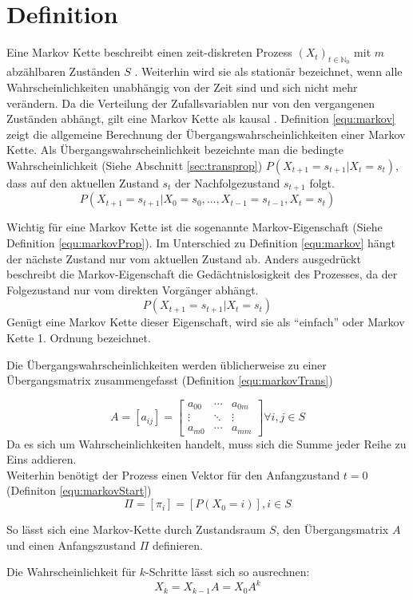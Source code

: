 \section{Definition}
Eine Markov Kette beschreibt einen zeit-diskreten Prozess \((X_t)_{t\in\mathbb{N}_0}\) mit  \(m\) abzählbaren Zuständen \(S\) \cite{stochMod}.
Weiterhin wird sie als stationär bezeichnet, wenn alle Wahrscheinlichkeiten unabhängig von der Zeit sind und sich nicht mehr verändern.
Da die Verteilung der Zufallsvariablen nur von den vergangenen Zuständen abhängt, gilt eine Markov Kette als kausal \cite[48]{mmmFink}.
Definition \ref{equ:markov} zeigt die allgemeine Berechnung der Übergangswahrscheinlichkeiten einer Markov Kette. Als Übergangswahrscheinlichkeit bezeichnte man die bedingte Wahrscheinlichkeit (Siehe Abschnitt \ref{sec:transprop}) \(P ( X_{t+1} = s_{t+1} | X_{t} = s_{t} ) \), dass auf den aktuellen Zustand \( s_{t}\) der Nachfolgezustand \( s_{t+1}\) folgt. 
\begin{equation}
\label{equ:markov}
P (X_{t+1} = s_{t+1} | X_0 = s_0, \ldots , X_{t-1} = s_{t-1}, X_{t} = s_{t})
\end{equation}

Wichtig für eine Markov Kette ist die sogenannte Markov-Eigenschaft (Siehe Definition \ref{equ:markovProp}). Im Unterschied zu Definition \ref{equ:markov} hängt der nächste Zustand nur vom aktuellen Zustand ab. Anders ausgedrückt beschreibt die Markov-Eigenschaft die Gedächtnislosigkeit des Prozesses, da der Folgezustand nur vom direkten Vorgänger abhängt. 
\begin{equation}
\label{equ:markovProp}
P ( X_{t+1} = s_{t+1} | X_{t} = s_{t} ) 
\end{equation}
Genügt eine Markov Kette dieser Eigenschaft, wird sie als ``einfach'' oder Markov Kette 1. Ordnung bezeichnet.

Die Übergangswahrscheinlichkeiten werden üblicherweise zu einer Übergangsmatrix zusammengefasst (Definition \ref{equ:markovTrans}) 

\begin{equation}
\label{equ:markovTrans}
A = [a_{ij}] =
\begin {bmatrix} 
  a_{00}&\cdots&a_{0m} \\
  \vdots&\ddots&\vdots \\
  a_{m0}&\cdots&a_{mm}
 \end {bmatrix} \forall i, j \in S
\end{equation}
Da es sich um Wahrscheinlichkeiten handelt, muss sich die Summe jeder Reihe zu Eins addieren. \\

Weiterhin benötigt der Prozess einen Vektor für den Anfangzustand $t = 0$ (Definiton \ref{equ:markovStart})
\begin{equation}
 \label{equ:markovStart}
 \Pi = [ \pi_i] = [ P (X_0 = i) ] , i \in S
\end{equation}

So lässt sich eine Markov-Kette durch Zustandsraum \(S\), den Übergangsmatrix \( A \) und einen Anfangszustand \( \Pi \) definieren.

Die Wahrscheinlichkeit für \( k \)-Schritte lässt sich so ausrechnen: 
\[ X_k = X_{k-1} A = X_0 A^k \] 

